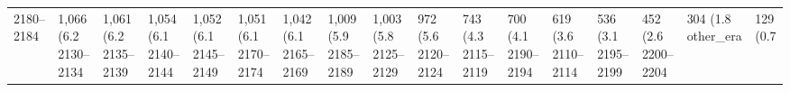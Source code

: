 \begin{table}[ht]
\begin{tabular}{ll}
  2180–2184 & 1,066 (6.2%
  2130–2134 & 1,061 (6.2%
  2135–2139 & 1,054 (6.1%
  2140–2144 & 1,052 (6.1%
  2145–2149 & 1,051 (6.1%
  2170–2174 & 1,042 (6.1%
  2165–2169 & 1,009 (5.9%
  2185–2189 & 1,003 (5.8%
  2125–2129 & 972 (5.6%
  2120–2124 & 743 (4.3%
  2115–2119 & 700 (4.1%
  2190–2194 & 619 (3.6%
  2110–2114 & 536 (3.1%
  2195–2199 & 452 (2.6%
  2200–2204 & 304 (1.8%
  other_era & 129 (0.7%
\hline
\end{tabular}
\end{table}

